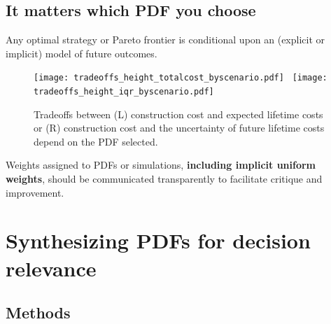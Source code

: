 \documentclass[12pt]{article}
\begin{document}
\subsection{It matters which PDF you choose}

Any optimal strategy or Pareto frontier is conditional upon an (explicit or implicit) model of future outcomes.
\begin{figure}
    \centering
    \texttt{[image: tradeoffs\_height\_totalcost\_byscenario.pdf]}~
    \texttt{[image: tradeoffs\_height\_iqr\_byscenario.pdf]}
    \caption{
        Tradeoffs between (L) construction cost and expected lifetime costs or (R) construction cost and the uncertainty of future lifetime costs depend on the PDF selected.
    }
    \label{fig:tradeoffs}
\end{figure}
Weights assigned to PDFs or simulations, \textbf{including implicit uniform weights}, should be communicated transparently to facilitate critique and improvement.

\section{Synthesizing PDFs for decision relevance}\label{sec:prior-averaging}

\subsection{Methods}
\end{document}
